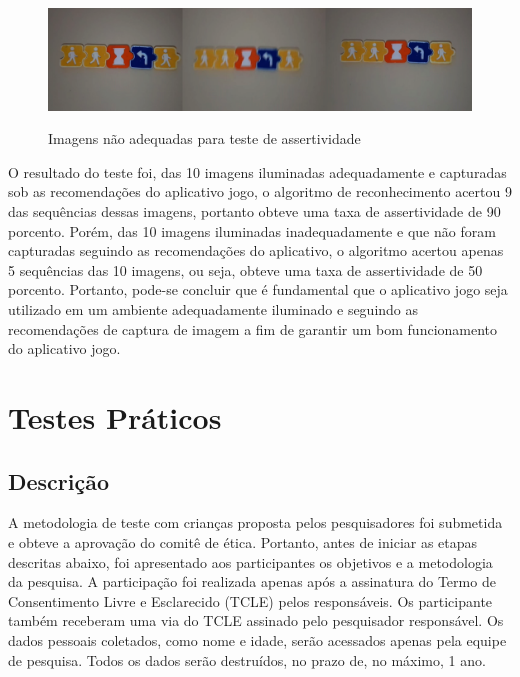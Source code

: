 \begin{figure}[H]
    \caption{Imagens não adequadas para teste de assertividade}
    \centering
    \includegraphics[width=15cm]{Imagens/Cap5/tta_ruim.PNG}
    \label{figura:tta_ruim}
\end{figure}

O resultado do teste foi, das 10 imagens iluminadas adequadamente e capturadas sob as recomendações do aplicativo jogo, o algoritmo de reconhecimento acertou 9 das sequências dessas imagens, portanto obteve uma taxa de assertividade de 90 porcento. Porém, das 10 imagens iluminadas inadequadamente e que não foram capturadas seguindo as recomendações do aplicativo, o algoritmo acertou apenas 5 sequências das 10 imagens, ou seja, obteve uma taxa de assertividade de 50 porcento. Portanto, pode-se concluir que é fundamental que o aplicativo jogo seja utilizado em um ambiente adequadamente iluminado e seguindo as recomendações de captura de imagem a fim de garantir um bom funcionamento do aplicativo jogo.


\section{Testes Práticos}

\subsection{\textbf{Descrição}}


A metodologia de teste com crianças proposta pelos pesquisadores foi submetida e obteve a aprovação do comitê de ética. Portanto, antes de iniciar as etapas descritas abaixo, foi apresentado aos participantes os objetivos e a metodologia da pesquisa. A participação foi  realizada apenas após a assinatura do Termo de Consentimento Livre e Esclarecido (TCLE) pelos responsáveis. Os participante também receberam uma via do TCLE assinado pelo pesquisador responsável. Os dados pessoais coletados, como nome e idade, serão acessados apenas pela equipe de pesquisa. Todos os dados serão destruídos, no prazo de, no máximo, 1 ano.

